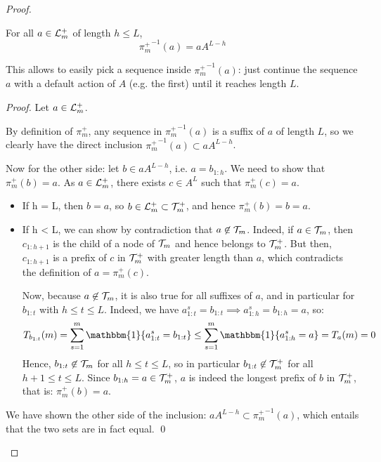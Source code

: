 \documentclass[runningheads, envcountsame, a4paper]{llncs}
\begin{document}
\begin{proof}
\begin{lemma}
\label{lemma:inverse-proj}
For all $a\in \mathcal{L}_m^+$ of length $h\leq L$,
\begin{equation*}
    {\pi_m^+}^{-1}(a) = a A^{L-h}
\end{equation*}

This allows to easily pick a sequence inside ${\pi_m^+}^{-1}(a)$: just continue the sequence $a$ with a default action of $A$ (e.g. the first) until it reaches length $L$.
\end{lemma}
\begin{proof}
Let $a\in \mathcal{L}_m^+$. 

By definition of $\pi_m^+$, any sequence in ${\pi_m^+}^{-1}(a)$ is a suffix of $a$ of length $L$, so we clearly have the direct inclusion ${\pi_m^+}^{-1}(a) \subset a A^{L-h}$.

Now for the other side: let $b\in a A^{L-h}$, i.e. $a=b_{1:h}$. We need to show that $\pi_m^+(b) = a$.
As $a\in \mathcal{L}_m^+$, there exists $c\in A^L$ such that $\pi_m^+(c) = a$.
\begin{itemize}
    \item If h = L, then $b=a$, so $b \in \mathcal{L}_m^+ \subset \mathcal{T}_m^+$, and hence $\pi_m^+(b)=b=a$.
    \item If h < L, we can show by contradiction that $a \not \in \mathcal{T}_m$. Indeed, if $a \in \mathcal{T}_m$, then $c_{1:h+1}$ is the child of a node of $\mathcal{T}_m$ and hence belongs to $\mathcal{T}_m^+$. But then, $c_{1:h+1}$ is a prefix of $c$ in $\mathcal{T}_m^+$ with greater length than $a$, which contradicts the definition of $a = \pi_m^+(c)$.
    
    Now, because $a \not \in \mathcal{T}_m$, it is also true for all suffixes of $a$, and in particular for $b_{1:t}$ with $h \leq t \leq L$. Indeed, we have $a^s_{1:t} = b_{1:t} \implies a^s_{1:h} = b_{1:h} = a$, so:
    \begin{equation*}
        T_{b_{1:t}}(m) = \sum_{s=1}^m \mathbbm{1}\{a^s_{1:t} = b_{1:t}\} \leq \sum_{s=1}^m \mathbbm{1}\{a^s_{1:h} = a\} = T_a(m) = 0
    \end{equation*}
    Hence, $b_{1:t} \not \in \mathcal{T}_m$ for all $h \leq t \leq L$, so in particular $b_{1:t} \not \in \mathcal{T}_m^+$ for all $h+1 \leq t \leq L$. Since $b_{1:h} = a \in \mathcal{T}_m^+$, $a$ is indeed the longest prefix of $b$ in $\mathcal{T}_m^+$, that is: $\pi_m^+(b) = a$.
\end{itemize}
We have shown the other side of the inclusion: $a A^{L-h} \subset {\pi_m^+}^{-1}(a)$, which entails that the two sets are in fact equal.
\qed
\end{proof}


\end{proof}
\end{document}
